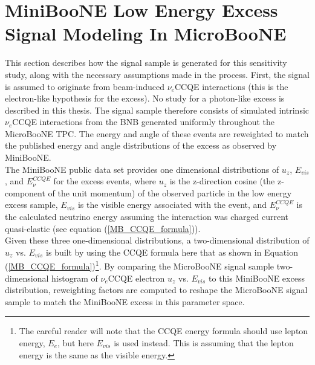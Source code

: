 \section{MiniBooNE Low Energy Excess Signal Modeling In MicroBooNE}\label{MBLEESignalModeling_section}
This section describes how the signal sample is generated for this sensitivity study, along with the necessary assumptions made in the process. First, the signal is assumed to originate from beam-induced $\nu_e$CCQE interactions (this is the electron-like hypothesis for the excess). No study for a photon-like excess is described in this thesis. The signal sample therefore consists of simulated intrinsic $\nu_e$CCQE interactions from the BNB generated uniformly throughout the MicroBooNE TPC. The energy and angle of these events are reweighted to match the published energy and angle distributions of the excess as observed by MiniBooNE. \\

The MiniBooNE public data set\cite{MB_lee_datarelease} provides one dimensional distributions of $u_z$, $E_{vis}$, and $E_\nu^{CCQE}$ for the excess events, where $u_z$ is the z-direction cosine (the z- component of the unit momentum) of the observed particle in the low energy excess sample, $E_{vis}$ is the visible energy associated with the event, and $E_{\nu}^{CCQE}$ is the calculated neutrino energy assuming the interaction was charged current quasi-elastic (see equation (\ref{MB_CCQE_formula})).\\

Given these three one-dimensional distributions, a two-dimensional distribution of $u_z$ vs. $E_{vis}$ is built by using the CCQE formula here that as shown in Equation (\ref{MB_CCQE_formula})\footnote{The careful reader will note that the CCQE energy formula should use lepton energy, $E_e$, but here $E_{vis}$ is used instead. This is assuming that the lepton energy is the same as the visible energy.}. By comparing the MicroBooNE signal sample two-dimensional histogram of $\nu_e$CCQE electron $u_z$ vs. $E_{vis}$ to this MiniBooNE excess distribution, reweighting factors are computed to reshape the MicroBooNE signal sample to match the MiniBooNE excess in this parameter space.\\

